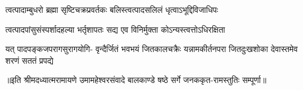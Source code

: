 

\addtocounter{shlokacount}{72}

\twolineshloka
{त्वत्पादाम्बुधरो ब्रह्मा सृष्टिचक्रप्रवर्तकः}
{बलिस्त्वत्पादसलिलं धृत्वाऽभूद्दिविजाधिपः} %

\twolineshloka
{त्वत्पादपांसुसंस्पर्शादहल्या भर्तृशापतः}
{सद्य एव विनिर्मुक्ता कोऽन्यस्त्वत्तोऽधिरक्षिता} %

\fourlineindentedshloka
{यत् पादपङ्कजपरागसुरागयोगि-}
{वृन्दैर्जितं भवभयं जितकालचक्रैः}
{यन्नामकीर्तनपरा जितदुःखशोका}
{देवास्तमेव शरणं सततं प्रपद्ये} %


{॥इति श्रीमदध्यात्मरामायणे उमामहेश्वरसंवादे बालकाण्डे षष्ठे सर्गे
जनककृत-रामस्तुतिः सम्पूर्णा॥}
